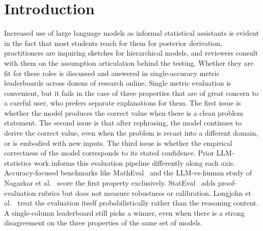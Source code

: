 
\section{Introduction}
\label{sec:intro}

Increased use of large language models as informal statistical
assistants is evident in the fact that most students reach for
them for posterior derivation, practitioners are inquiring sketches
for hierarchical models, and reviewers consult with them on the
assumption articulation behind the testing. Whether they are fit for
these roles is discussed and answered in single-accuracy metric
leaderboards across dozens of research online. Single metric
evaluation is convenient, but it fails in the case of three
properties that are of great concern to a careful user, who prefers
separate explanations for them. The first issue is whether the model
produces the correct value when there is a clean problem statement.
The second issue is that after rephrasing, the model continues to
derive the correct value, even when the problem is recast into a
different domain, or is embodied with new inputs. The third issue
is whether the empirical correctness of the model corresponds to its
stated confidence. Prior LLM-statistics work informs this evaluation
pipeline differently along each axis. Accuracy-focused benchmarks
like MathEval~\cite{liu2025matheval} and the LLM-vs-human study of
Nagarkar et al.~\cite{nagarkar2026canllm} score the first property
exclusively. StatEval~\cite{lu2025stateval} adds proof-evaluation
rubrics but does not measure robustness or calibration. Longjohn et
al.~\cite{longjohn2025bayesian} treat the evaluation itself
probabilistically rather than the reasoning content. A single-column
leaderboard still picks a winner, even when there is a strong
disagreement on the three properties of the same set of models.

